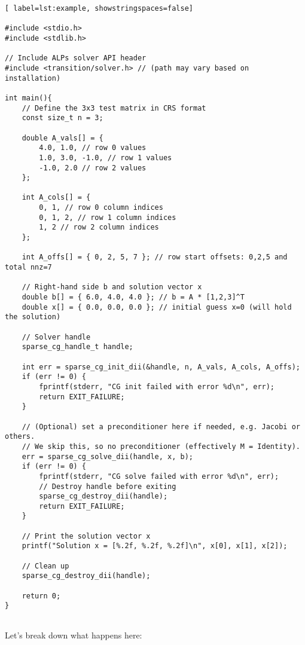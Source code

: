 \begin{lstlisting}[ label=lst:example, showstringspaces=false]

#include <stdio.h>
#include <stdlib.h>

// Include ALPs solver API header
#include <transition/solver.h> // (path may vary based on installation)

int main(){
    // Define the 3x3 test matrix in CRS format
    const size_t n = 3;
    
    double A_vals[] = {
        4.0, 1.0, // row 0 values
        1.0, 3.0, -1.0, // row 1 values
        -1.0, 2.0 // row 2 values
    };
    
    int A_cols[] = {
        0, 1, // row 0 column indices
        0, 1, 2, // row 1 column indices
        1, 2 // row 2 column indices
    };
    
    int A_offs[] = { 0, 2, 5, 7 }; // row start offsets: 0,2,5 and total nnz=7
    
    // Right-hand side b and solution vector x
    double b[] = { 6.0, 4.0, 4.0 }; // b = A * [1,2,3]^T
    double x[] = { 0.0, 0.0, 0.0 }; // initial guess x=0 (will hold the solution)
    
    // Solver handle
    sparse_cg_handle_t handle;
    
    int err = sparse_cg_init_dii(&handle, n, A_vals, A_cols, A_offs);
    if (err != 0) {
        fprintf(stderr, "CG init failed with error %d\n", err);
        return EXIT_FAILURE;
    }
    
    // (Optional) set a preconditioner here if needed, e.g. Jacobi or others.
    // We skip this, so no preconditioner (effectively M = Identity).
    err = sparse_cg_solve_dii(handle, x, b);
    if (err != 0) {
        fprintf(stderr, "CG solve failed with error %d\n", err);
        // Destroy handle before exiting
        sparse_cg_destroy_dii(handle);
        return EXIT_FAILURE;
    }
    
    // Print the solution vector x
    printf("Solution x = [%.2f, %.2f, %.2f]\n", x[0], x[1], x[2]);
    
    // Clean up
    sparse_cg_destroy_dii(handle);
    
    return 0;
}


\end{lstlisting}

Let’s break down what happens here:

